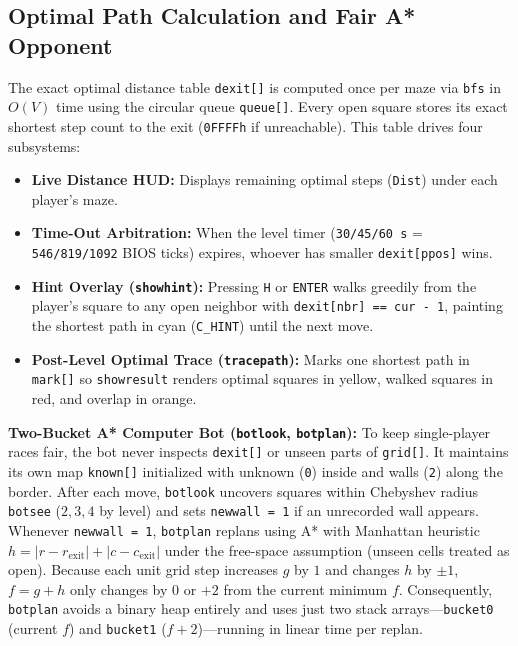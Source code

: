 \documentclass[11pt,a4paper]{article}
\begin{document}
\subsection{Optimal Path Calculation and Fair A* Opponent}
The exact optimal distance table \texttt{dexit[]} is computed once per maze via \texttt{bfs} in $O(V)$ time using the circular queue \texttt{queue[]}. Every open square stores its exact shortest step count to the exit (\texttt{0FFFFh} if unreachable). This table drives four subsystems:
\begin{itemize}
    \item \textbf{Live Distance HUD:} Displays remaining optimal steps (\texttt{Dist}) under each player's maze.
    \item \textbf{Time-Out Arbitration:} When the level timer (\texttt{30/45/60\,s} = \texttt{546/819/1092} BIOS ticks) expires, whoever has smaller \texttt{dexit[ppos]} wins.
    \item \textbf{Hint Overlay (\texttt{showhint}):} Pressing \texttt{H} or \texttt{ENTER} walks greedily from the player's square to any open neighbor with \texttt{dexit[nbr] == cur - 1}, painting the shortest path in cyan (\texttt{C\_HINT}) until the next move.
    \item \textbf{Post-Level Optimal Trace (\texttt{tracepath}):} Marks one shortest path in \texttt{mark[]} so \texttt{showresult} renders optimal squares in yellow, walked squares in red, and overlap in orange.
\end{itemize}

\textbf{Two-Bucket A* Computer Bot (\texttt{botlook}, \texttt{botplan}):} To keep single-player races fair, the bot never inspects \texttt{dexit[]} or unseen parts of \texttt{grid[]}. It maintains its own map \texttt{known[]} initialized with unknown (\texttt{0}) inside and walls (\texttt{2}) along the border. After each move, \texttt{botlook} uncovers squares within Chebyshev radius \texttt{botsee} ($2, 3, 4$ by level) and sets \texttt{newwall = 1} if an unrecorded wall appears. Whenever \texttt{newwall = 1}, \texttt{botplan} replans using A* with Manhattan heuristic $h = |r - r_{\text{exit}}| + |c - c_{\text{exit}}|$ under the free-space assumption (unseen cells treated as open). Because each unit grid step increases $g$ by $1$ and changes $h$ by $\pm 1$, $f = g + h$ only changes by $0$ or $+2$ from the current minimum $f$. Consequently, \texttt{botplan} avoids a binary heap entirely and uses just two stack arrays---\texttt{bucket0} (current $f$) and \texttt{bucket1} ($f+2$)---running in linear time per replan.
\end{document}
